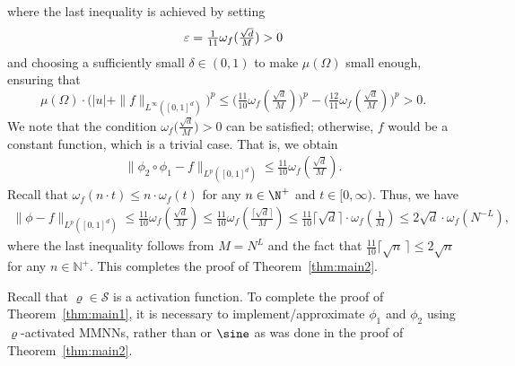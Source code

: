 \documentclass[11pt,a4paper]{article}
\begin{document}
where the last inequality is achieved by setting
\begin{equation*}
    \varepsilon = \tfrac{1}{11}\omega_f(\tfrac{\sqrt{d}}{M})>0
\end{equation*}
and choosing a sufficiently small \(\delta \in (0,1)\) to make \(\mu(\Omega)\) small enough, ensuring that
\begin{equation*}
    \mu(\Omega)\cdot \Big(|u|+\|f\|_{L^\infty([0,1]^d)}\Big)^p
    \le  \Big(\tfrac{11}{10}\omega_f(\tfrac{\sqrt{d}}{M})\Big)^p - \Big(\tfrac{12}{11}\omega_f(\tfrac{\sqrt{d}}{M})\Big)^p
    >0.
\end{equation*}
We note that the condition \(\omega_f\big(\frac{\sqrt{d}}{M}\big) > 0\) can be satisfied; otherwise, \(f\) would be a constant function, which is a trivial case.
That is, we obtain
\begin{equation}
\label{eq:phi2:phi1:-f}
\begin{split}
\| \phi_2\circ \phi_1-f\|_{L^p([0,1]^d)}
\le \tfrac{11}{10}\omega_f(\tfrac{\sqrt{d}}{M}).
\end{split}
\end{equation}
Recall that  $\omega_f(n\cdot  t)\le n\cdot \omega_f(t)$ for any $n\in\N^+$ and $t\in [0,\infty)$. Thus, we have
	\begin{equation*}
	\begin{split}
	\| \phi-f\|_{L^p([0,1]^d)}
 \le  \tfrac{11}{10}\omega_f(\tfrac{\sqrt{d}}{M}) \le \tfrac{11}{10}\omega_f(\tfrac{\lceil\sqrt{d}\rceil}{M}) 
 \le   \tfrac{11}{10}\big\lceil\sqrt{d}\big\rceil\cdot\omega_f(\tfrac{1}{M}) 
 \le 2\sqrt{d}\cdot\omega_f(N^{-L}),
	\end{split}
	\end{equation*}
where the last inequality follows from \(M = N^L\) and the fact that \(\frac{11}{10} \lceil \sqrt{n} \, \rceil \le 2 \sqrt{n}\) for any \(n \in \mathbb{N}^+\). This completes the proof of Theorem~\ref{thm:main2}.


Recall that \(\varrho \in \mathcal{S}\) is a \SinTU{} activation function. 
To complete the proof of Theorem~\ref{thm:main1}, it is necessary to implement/approximate \(\phi_1\) and \(\phi_2\) using $\varrho$-activated MMNNs, rather than \ReLU{} or \(\sine\) as was done in the proof of Theorem~\ref{thm:main2}.
\end{document}
